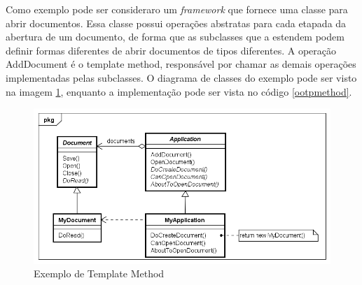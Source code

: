 Como exemplo pode ser consideraro um \textit{framework} que fornece uma classe para abrir documentos. Essa classe possui operações abstratas para cada etapada da abertura de um documento, de forma que as subclasses que a estendem podem definir formas diferentes de abrir documentos de tipos diferentes. A operação AddDocument é o template method, responsável por chamar as demais operações implementadas pelas subclasses. 
O diagrama de classes do exemplo pode ser visto na imagem \ref{tpmethod_exemplo}, 
enquanto a implementação pode ser vista no código \ref{ootpmethod}.

\begin{figure}[htb]
	\caption{\label{tpmethod_exemplo}Exemplo de Template Method}
	\begin{center}
	    \includegraphics[scale=0.5]{5_padroes-contexto-funcional/5.3_comportamentais/5.3.10_template-method/templatemethod_exemplo.png}
	\end{center}
\end{figure}

